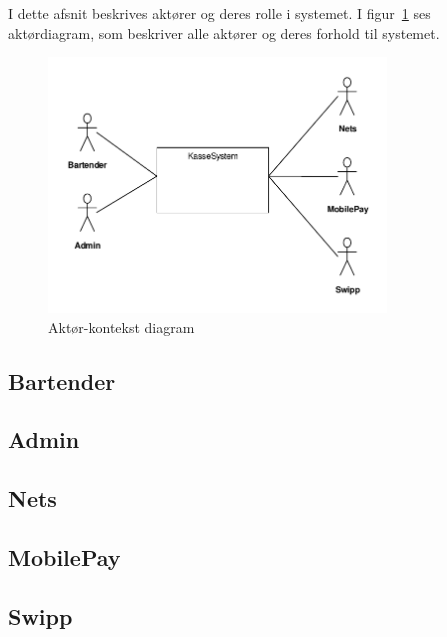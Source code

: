 
I dette afsnit beskrives aktører og deres rolle i systemet. I figur~\ref{fig:actordiagram} ses aktørdiagram, som beskriver alle aktører og deres forhold til systemet.
\begin{figure}
	\centering
	\includegraphics[width=0.8\textwidth]{Kravspecifikation/Actor/Actor.pdf}
	\caption{Aktør-kontekst diagram}
	\label{fig:actordiagram}
\end{figure}

\newpage
\subsection{Bartender}
\begin{usecase}
\end{usecase}

\subsection{Admin}
\begin{usecase}
\end{usecase}

\subsection{Nets}
\begin{usecase}
\end{usecase}

\subsection{MobilePay}
\begin{usecase}
\end{usecase}

\subsection{Swipp}
\begin{usecase}
\end{usecase}